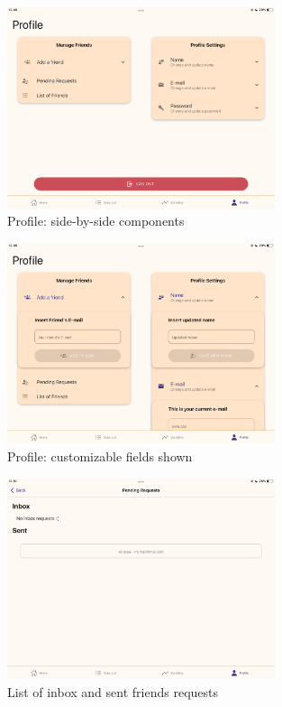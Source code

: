 \documentclass[12pt]{article}
\begin{document}
\begin{figure}[h!]
    \begin{center}
        \includegraphics[width=0.7\textwidth, clip]{../../assets/tablet/profile.PNG}
    \end{center}
    \caption{Profile: side-by-side components}
    \label{fig:tprofile}
\end{figure}

\begin{figure}[h!]
    \begin{center}
        \includegraphics[width=0.7\textwidth, clip]{../../assets/tablet/profileOpen.PNG}
    \end{center}
    \caption{Profile: customizable fields shown}
    \label{fig:tprofileOpen}
\end{figure}

\begin{figure}[h!]
    \begin{center}
        \includegraphics[width=0.7\textwidth, clip]{../../assets/tablet/inbox.PNG}
    \end{center}
    \caption{List of inbox and sent friends requests}
    \label{fig:tinbox}
\end{figure}
\end{document}
